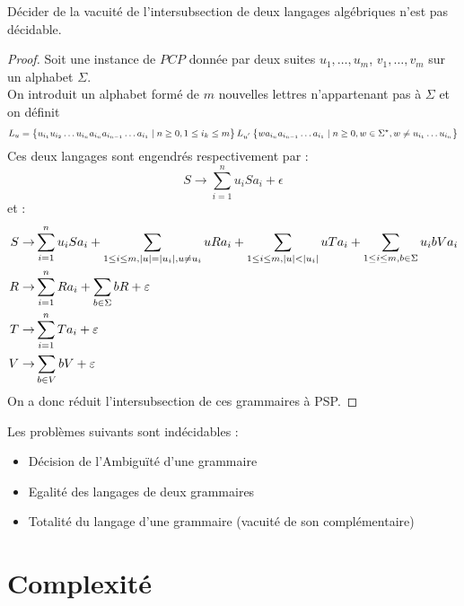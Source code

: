 \documentclass{cours}
\begin{document}
\begin{theorem}
    Décider de la vacuité de l'intersubsection de deux langages algébriques n'est pas décidable.
\end{theorem}
\begin{proof}
    Soit une instance de $PCP$ donnée par deux suites $u_{1}, \ldots, u_{m}$, $v_{1}, \ldots, v_{m}$ sur un alphabet $\Sigma$.\\
    On introduit un alphabet formé de $m$ nouvelles lettres n'appartenant pas à $\Sigma$ et on définit 
    \[
        L_{u} = \left\{u_{i_{1}}u_{i_{2}}\ldots u_{i_{n}}a_{i_{n}}a_{i_{n - 1}}\ldots a_{i_{1}}\mid n \geq 0, 1 \leq i_{k} \leq m\right\}\\ 
        L_{u^{'}} \left\{wa_{i_{n}}a_{i_{n-1}}\ldots a_{i_{1}}\mid n \geq 0, w \in \Sigma^{\star}, w \neq u_{i_{1}}\ldots u_{i_{n}}\right\}
    \]
    Ces deux langages sont engendrés respectivement par :
    \[
        S \rightarrow \sum_{i = 1}^{n}u_{i}Sa_{i} + \epsilon
    \]
    et : 
    \[
        \begin{aligned}
            S \rightarrow & \sum_{i = 1}^{n} u_{i}Sa_{i} + \sum_{1 \leq i \leq m, \left|u\right| = \left|u_{i}\right|, u \neq u_{i}} uRa_{i} + \sum_{1 \leq i \leq m, \left|u\right| < \left|u_{i}\right|} uTa_{i} + \sum_{1 \leq i \leq m, b \in \Sigma} u_{i}bVa_{i}\\
            R \rightarrow & \sum_{i = 1}^{n} Ra_{i} + \sum_{b \in \Sigma} bR + \varepsilon\\
            T \rightarrow & \sum_{i = 1}^{n} Ta_{i} + \varepsilon\\
            V \rightarrow & \sum_{b \in V}bV + \varepsilon
        \end{aligned}    
    \]
    On a donc réduit l'intersubsection de ces grammaires à PSP.
\end{proof}

\begin{proposition}
    Les problèmes suivants sont indécidables : 
    \begin{itemize}
        \item Décision de l'Ambiguïté d'une grammaire
        \item Egalité des langages de deux grammaires
        \item Totalité du langage d'une grammaire (vacuité de son complémentaire)
    \end{itemize}
\end{proposition}

\chapter{Complexité}
\end{document}
